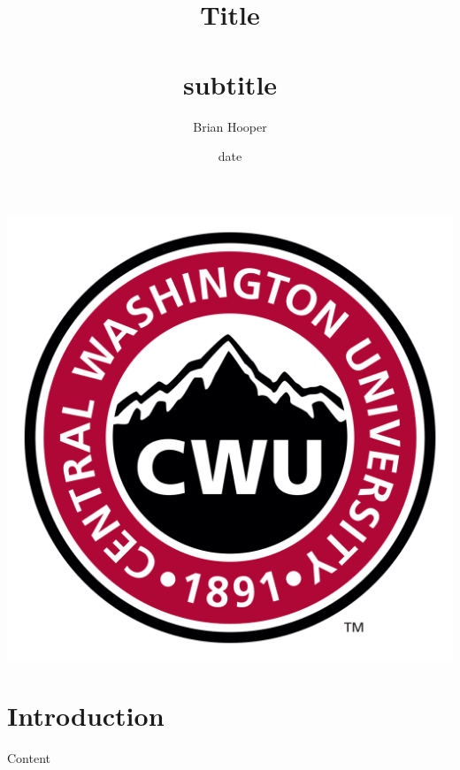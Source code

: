 \documentclass[12pt]{article}
\title{\huge{\textbf{Title}} \\~\\ \large{subtitle}}
\author{Brian Hooper}
\date{date}
\begin{document}
	\maketitle
	\begin{center}
		\includegraphics[width=0.20\columnwidth]{figures/logos/cwu.png}
	\end{center}
	\tableofcontents \pagebreak
	
	\section{Introduction}
	
	Content \cite{knuth}
	\clearpage
	
\end{document}
